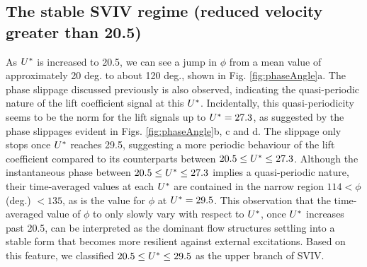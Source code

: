 \documentclass[oneside]{utmthesis}
\begin{document}
\subsection{The stable SVIV regime (reduced velocity greater than 20.5)} \label{ssec:svivRegime}
As $U^{*}$ is increased to 20.5, we can see a jump in $\phi$ from a mean value of approximately 20 deg. to about 120 deg., shown in Fig. \ref{fig:phaseAngle}a. The phase slippage discussed previously is also observed, indicating the quasi-periodic nature of the lift coefficient signal at this $U^{*}$. Incidentally, this quasi-periodicity seems to be the norm for the lift signals up to $U^{*} = 27.3$, as suggested by the phase slippages evident in Figs. \ref{fig:phaseAngle}b, c and d. The slippage only stops once $U^{*}$ reaches 29.5, suggesting a more periodic behaviour of the lift coefficient compared to its counterparts between $20.5 \leq U^{*} \leq 27.3$. Although the instantaneous phase between $20.5 \leq U^{*} \leq 27.3$ implies a quasi-periodic nature, their time-averaged values at each $U^{*}$ are contained in the narrow region $114 < \phi$ (deg.) $< 135$, as is the value for $\phi$ at $U^{*} = 29.5$. This observation that the time-averaged value of $\phi$ to only slowly vary with respect to $U^{*}$, once $U^{*}$ increases past 20.5, can be interpreted as the dominant flow structures settling into a stable form that becomes more resilient against external excitations. Based on this feature, we classified $20.5 \leq U^{*} \leq 29.5$ as the upper branch of SVIV.
\end{document}
